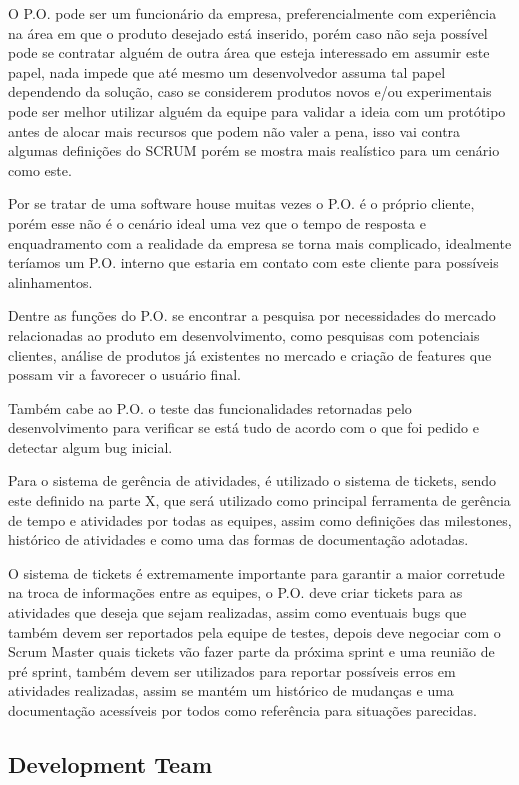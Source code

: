 \documentclass[
    article,            %
    11pt,               %
    oneside,            %
    a4paper,            %
    english,            %
    brazil,             %
    sumario=tradicional
    ]{abntex2}
\begin{document}
O P.O. pode ser um funcionário da empresa, preferencialmente com experiência na área em que o produto desejado está inserido, porém caso não seja possível pode se contratar alguém de outra área que esteja interessado em assumir este papel, nada impede que até mesmo um desenvolvedor assuma tal papel dependendo da solução, caso se considerem produtos novos e/ou experimentais pode ser melhor utilizar alguém da equipe para validar a ideia com um protótipo antes de alocar mais recursos que podem não valer a pena, isso vai contra algumas definições do SCRUM porém se mostra mais realístico para um cenário como este.

Por se tratar de uma software house muitas vezes o P.O. é o próprio cliente, porém esse não é o cenário ideal uma vez que o tempo de resposta e enquadramento com a realidade da empresa se torna mais complicado, idealmente teríamos um P.O. interno que estaria em contato com este cliente para possíveis alinhamentos.

Dentre as funções do P.O. se encontrar a pesquisa por necessidades do mercado relacionadas ao produto em desenvolvimento, como pesquisas com potenciais clientes, análise de produtos já existentes no mercado e criação de features que possam vir a favorecer o usuário final.

Também cabe ao P.O. o teste das funcionalidades retornadas pelo desenvolvimento para verificar se está tudo de acordo com o que foi pedido e detectar algum bug inicial.

Para o sistema de gerência de atividades, é utilizado o sistema de tickets, sendo este definido na parte X, que será utilizado como principal ferramenta de gerência de tempo e atividades por todas as equipes, assim como definições das milestones, histórico de atividades e como uma das formas de documentação adotadas.

O sistema de tickets é extremamente importante para garantir a maior corretude na troca de informações entre as equipes, o P.O. deve criar tickets para as atividades que deseja que sejam realizadas, assim como eventuais bugs que também devem ser reportados pela equipe de testes, depois deve negociar com o Scrum Master quais tickets vão fazer parte da próxima sprint e uma reunião de pré sprint, também devem ser utilizados para reportar possíveis erros em atividades realizadas, assim se mantém um histórico de mudanças e uma documentação acessíveis por todos como referência para situações parecidas.

\subsection{Development Team}
\end{document}
